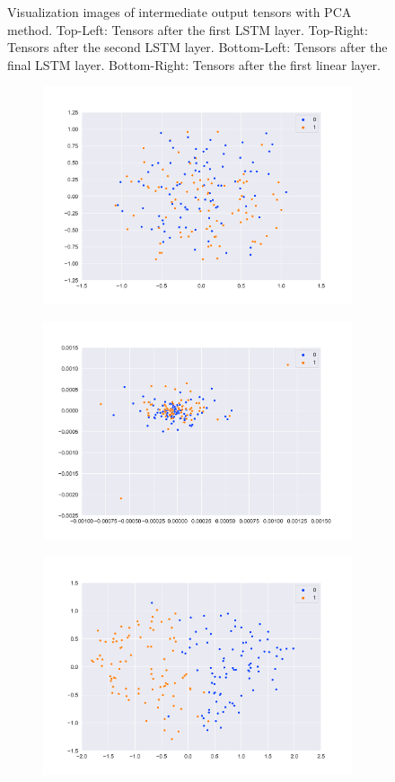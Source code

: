 \begin{figure}[htbp]
\begin{subfigure}
    \end{subfigure}
    \caption{Visualization images of intermediate output tensors with PCA method. Top-Left: Tensors after the first LSTM layer. Top-Right: Tensors after the second LSTM layer. Bottom-Left: Tensors after the final LSTM layer. Bottom-Right: Tensors after the first linear layer.}
    \label{fig:sst_pca}
\end{figure}

\begin{figure}[htbp]
    \centering
    \begin{subfigure}
        \centering
        \includegraphics[width=0.45\linewidth]{../images/sst2_feature_map1_tsne.png}
    \end{subfigure}
    \begin{subfigure}
        \centering
        \includegraphics[width=0.45\linewidth]{../images/sst2_feature_map2_tsne.png}
    \end{subfigure}
    \begin{subfigure}
        \centering
        \includegraphics[width=0.45\linewidth]{../images/sst2_feature_map3_tsne.png}

\end{subfigure}
\end{figure}
